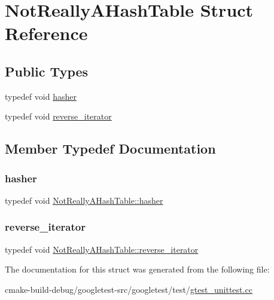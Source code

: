 \hypertarget{structNotReallyAHashTable}{}\section{Not\+Really\+A\+Hash\+Table Struct Reference}
\label{structNotReallyAHashTable}
\subsection*{Public Types}
\begin{DoxyCompactItemize}
\item 
typedef void \mbox{\hyperlink{structNotReallyAHashTable_a0206bef6150919c8ba5d539d5bf555f7}{hasher}}
\item 
typedef void \mbox{\hyperlink{structNotReallyAHashTable_a8dbee2a2a80768191c736fb57367cfe7}{reverse\+\_\+iterator}}
\end{DoxyCompactItemize}


\subsection{Member Typedef Documentation}
\mbox{\label{structNotReallyAHashTable_a0206bef6150919c8ba5d539d5bf555f7}} 
\subsubsection{\texorpdfstring{hasher}{hasher}}
{\footnotesize\ttfamily typedef void \mbox{\hyperlink{structNotReallyAHashTable_a0206bef6150919c8ba5d539d5bf555f7}{Not\+Really\+A\+Hash\+Table\+::hasher}}}

\mbox{\label{structNotReallyAHashTable_a8dbee2a2a80768191c736fb57367cfe7}} 
\subsubsection{\texorpdfstring{reverse\_iterator}{reverse\_iterator}}
{\footnotesize\ttfamily typedef void \mbox{\hyperlink{structNotReallyAHashTable_a8dbee2a2a80768191c736fb57367cfe7}{Not\+Really\+A\+Hash\+Table\+::reverse\+\_\+iterator}}}



The documentation for this struct was generated from the following file\+:\begin{DoxyCompactItemize}
\item 
cmake-\/build-\/debug/googletest-\/src/googletest/test/\mbox{\hyperlink{gtest__unittest_8cc}{gtest\+\_\+unittest.\+cc}}\end{DoxyCompactItemize}
